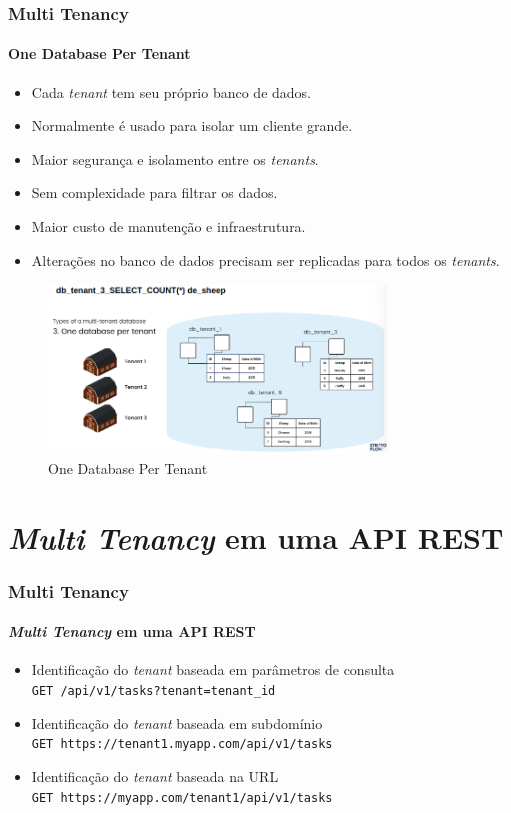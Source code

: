 \documentclass[
	9pt, %
	t, %
]{beamer}
\begin{document}
\begin{frame}
	\frametitle{Multi Tenancy}
	\framesubtitle{One Database Per Tenant}

	\begin{itemize}
		\item Cada \textit{tenant} tem seu próprio banco de dados.
		\item Normalmente é usado para isolar um cliente grande.
		\item Maior segurança e isolamento entre os \textit{tenants}.
		\item Sem complexidade para filtrar os dados.
		\item \alert{Maior custo de manutenção e infraestrutura.}
		\item \alert{Alterações no banco de dados precisam ser replicadas para todos os \textit{tenants}.}
	\end{itemize}

	\begin{figure}
		\centering
		\includegraphics[width=0.8\textwidth]{one_per_database.png}
		\caption{One Database Per Tenant}
	\end{figure}

\end{frame}

\section{\textit{Multi Tenancy} em uma API REST}

\begin{frame}
	\frametitle{Multi Tenancy}
	\framesubtitle{\textit{Multi Tenancy} em uma API REST}

	\begin{itemize}
		\item Identificação do \textit{tenant} baseada em parâmetros de consulta\\
		\texttt{GET /api/v1/tasks?tenant=tenant\_id}
		\item Identificação do \textit{tenant} baseada em subdomínio\\
		\texttt{GET https://tenant1.myapp.com/api/v1/tasks}
		\item Identificação do \textit{tenant} baseada na URL\\
		\texttt{GET https://myapp.com/tenant1/api/v1/tasks}
	\end{itemize}

\end{frame}
\end{document}

